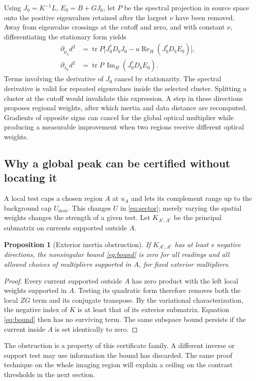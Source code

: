 \documentclass[anonymous,12pt]{iopjournal}
\newtheorem{proposition}[theorem]{Proposition}
\theoremstyle{remark}\newtheorem{remark}[theorem]{Remark}
\newcommand{\Herm}{\operatorname{Re}_{\!H}}\newcommand{\Imag}{\operatorname{Im}_{\!H}}
\newcommand{\tr}{\operatorname{tr}}\newcommand{\diag}{\operatorname{diag}}
\numberwithin{equation}{section}
\begin{document}
Using $J_0=K^{-1}L$, $E_0=B+GJ_0$, let $P$ be the spectral projection in source space onto the positive eigenvalues retained after the largest $\nu$ have been removed. Away from eigenvalue crossings at the cutoff and zero, and with constant $\nu$, differentiating the stationary form yields
\begin{align}
 \partial_{\mu_b}d^2&=\tr P\big[J_0^*D_bJ_0-u\Herm(J_0^*D_bE_0)\big],\nonumber\\
 \partial_{\lambda_b}d^2&=\tr P\,\Imag(J_0^*D_bE_0).\label{eq:gradient}
\end{align}
Terms involving the derivative of $J_0$ cancel by stationarity. The spectral derivative is valid for repeated eigenvalues inside the selected cluster. Splitting a cluster at the cutoff would invalidate this expression. A step in these directions proposes regional weights, after which inertia and data distance are recomputed. Gradients of opposite signs can cancel for the global optical multiplier while producing a measurable improvement when two regions receive different optical weights.

\subsection{Why a global peak can be certified without locating it}
A local test caps a chosen region $A$ at $u_A$ and lets its complement range up to the background cap $U_{\max}$. This changes $U$ in \eqref{eq:sector}; merely varying the spatial weights changes the strength of a given test. Let $K_{A^c,A^c}$ be the principal submatrix on currents supported outside $A$.
\begin{proposition}[Exterior inertia obstruction]\label{prop:exterior}
If $K_{A^c,A^c}$ has at least $s$ negative directions, the nonsingular bound \eqref{eq:bound} is zero for all readings and all allowed choices of multipliers supported in $A$, for fixed exterior multipliers.
\end{proposition}
\begin{proof}
Every current supported outside $A$ has zero product with the left local weights supported in $A$. Testing its quadratic form therefore removes both the local $ZG$ term and its conjugate transpose. By the variational characterization, the negative index of $K$ is at least that of its exterior submatrix. Equation \eqref{eq:bound} then has no surviving term. The same subspace bound persists if the current inside $A$ is set identically to zero.
\end{proof}
The obstruction is a property of this certificate family. A different inverse or support test may use information the bound has discarded. The same proof technique on the whole imaging region will explain a ceiling on the contrast thresholds in the next section.
\end{document}
